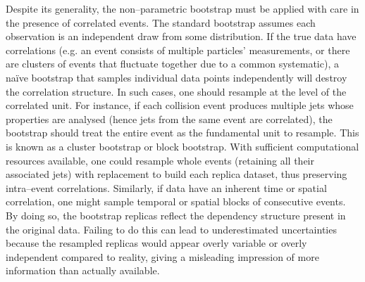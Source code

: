             Despite its generality, the non--parametric bootstrap must be applied with care in the presence of correlated events.
            The standard bootstrap assumes each observation is an independent draw from some distribution.
            If the true data have correlations (e.g. an event consists of multiple particles' measurements, or there are clusters of events that fluctuate together due to a common systematic), a na\"ive bootstrap that samples individual data points independently will destroy the correlation structure.
            In such cases, one should resample at the level of the correlated unit.
            For instance, if each collision event produces multiple jets whose properties are analysed (hence jets from the same event are correlated), the bootstrap should treat the entire event as the fundamental unit to resample.
            This is known as a cluster bootstrap or block bootstrap.
            With sufficient computational resources available, one could resample whole events (retaining all their associated jets) with replacement to build each replica dataset, thus preserving intra--event correlations.
            Similarly, if data have an inherent time or spatial correlation, one might sample temporal or spatial blocks of consecutive events.
            By doing so, the bootstrap replicas reflect the dependency structure present in the original data.
            Failing to do this can lead to underestimated uncertainties because the resampled replicas would appear overly variable or overly independent compared to reality, giving a misleading impression of more information than actually available.

